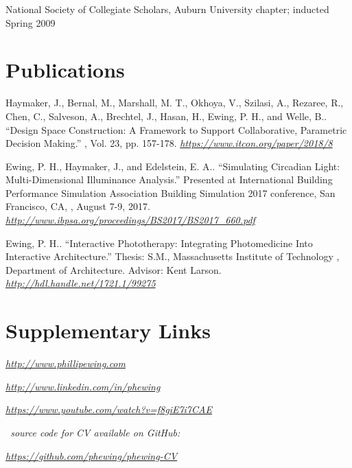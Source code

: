 \documentclass[letterpaper, oneside, 10pt]{article}
\begin{document}
 \DotSep{0.25em} National Society of Collegiate Scholars, Auburn
University chapter; inducted Spring 2009



\section*{Publications} %

\hangindent=10pt
Haymaker, J., Bernal, M., Marshall, M. T., Okhoya, V., Szilasi, A., Rezaree,
R., Chen, C., Salveson, A., Brechtel, J., Hasan, H., Ewing, P. H., and Welle,
B.. ``Design Space Construction: A Framework to Support
Collaborative, Parametric Decision Making.'' , Vol. 23, pp. 157-178. 
\textit{\url{https://www.itcon.org/paper/2018/8}}

\hangindent=10pt
Ewing, P. H., Haymaker, J., and Edelstein, E. A.. ``Simulating
Circadian Light: Multi-Dimensional Illuminance Analysis.'' Presented at
International Building Performance Simulation Association  Building
Simulation 2017 conference, San Francisco, CA, , August 7-9, 2017.
 \textit{\url{http://www.ibpsa.org/proceedings/BS2017/BS2017_660.pdf}}

\hangindent=10pt
Ewing, P. H.. ``Interactive Phototherapy: Integrating Photomedicine
Into Interactive Architecture.'' Thesis: S.M., Massachusetts Institute of
Technology , Department of Architecture. Advisor: Kent Larson.
 \textit{\url{http://hdl.handle.net/1721.1/99275}}

\section*{Supplementary Links} %

\DotSep{0.25em}
\textit{\url{http://www.phillipewing.com}}

\DotSep{0.25em}
\textit{\url{http://www.linkedin.com/in/phewing}}

\DotSep{0.25em}
\textit{\url{https://www.youtube.com/watch?v=f8giE7i7CAE}}

\vfill

\begin{center}

  \textit{\LaTeXe\ source code for CV available on GitHub:}

  \textit{\url{https://github.com/phewing/phewing-CV}}

\end{center}
\end{document}
